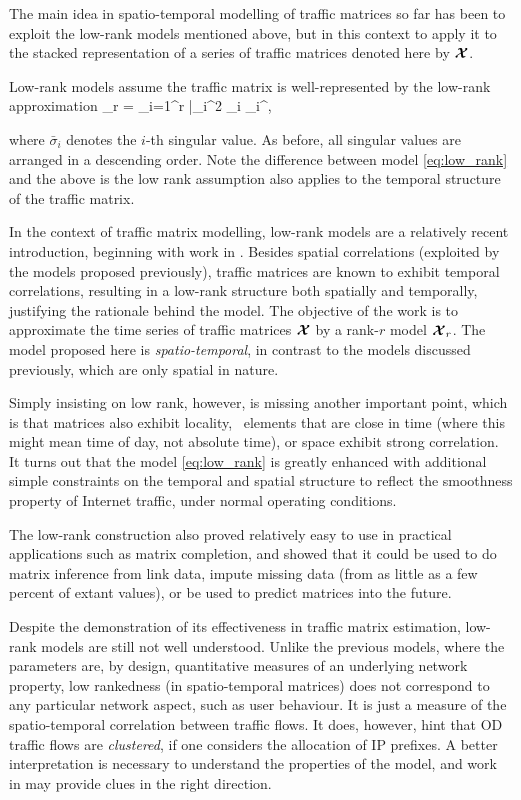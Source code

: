 The main idea in spatio-temporal modelling of traffic matrices so far
has been to exploit the low-rank models mentioned above, but in this
context to apply it to the stacked representation of a series of
traffic matrices denoted here by $\boldsymbol{\mathcal{X}}$. 

Low-rank models assume the traffic matrix is well-represented by the
low-rank approximation 
\be \cX_r = \sum_{i=1}^r \bar\sigma_i^2 \bu_i
\bv_i^\T,
\label{eq:low_rank}
\ee

\noindent where $\bar\sigma_i$ denotes the $i$-th singular value. 
As before, all singular values are arranged in a descending 
order. Note the difference between model \autoref{eq:low_rank} and the above is the 
low rank assumption also applies to the temporal structure of the traffic matrix.

In the context of traffic matrix modelling, low-rank models are a
relatively recent introduction, beginning with work in
\cite{Zhang09TMCS}. Besides spatial correlations (exploited by the
models proposed previously), traffic matrices are known to exhibit
temporal correlations, resulting in a low-rank structure both
spatially and temporally, justifying the rationale behind the
model. The objective of the work is to approximate the time series of
traffic matrices $\boldsymbol{\mathcal{X}}$ by a rank-$r$ model $\boldsymbol{\mathcal{X}}_r$.  The model
proposed here is \emph{spatio-temporal}, in contrast to the models
discussed previously, which are only spatial in nature.

Simply insisting on low rank, however, is missing another important point,
which is that matrices also exhibit locality, \ie~elements that are
close in time (where this might mean time of day, not absolute time),
or space exhibit strong correlation.  It turns out that the model
\autoref{eq:low_rank} is greatly enhanced with additional simple
constraints on the temporal and spatial structure to reflect the
smoothness property of Internet traffic, under normal operating
conditions. 

The low-rank construction also proved relatively easy to use in
practical applications such as matrix completion, and
\cite{Zhang09TMCS} showed that it could be used to do matrix inference
from link data, impute missing data (from as little as a few
percent of extant values), or be used to predict matrices into the
future.

Despite the demonstration of its effectiveness in traffic matrix
estimation, low-rank models are still not well understood. Unlike the
previous models, where the parameters are, by design, quantitative
measures of an underlying network property, low rankedness (in
spatio-temporal matrices) does not correspond to any particular
network aspect, such as user behaviour. It is just a measure of
the spatio-temporal correlation between traffic flows. It does,
however, hint that OD traffic flows are \emph{clustered}, if one considers 
the allocation of IP prefixes. A better interpretation is
necessary to understand the properties of the model, and work in
\cite{Bharti10Invisible,Lakhina04TrafficStruct} may provide clues in
the right direction.

